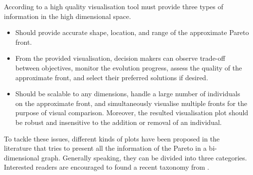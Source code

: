 According to \citet{Gao2019} a high quality visualisation tool must provide three types of information in the high dimensional space. 
\begin{itemize}
\item  Should provide accurate shape, location, and range of the approximate Pareto front. 
\item  From the provided visualisation, decision makers can observe trade-off between objectives, monitor the evolution progress, assess the quality of the approximate front, and select their preferred solutions if desired. 
\item  Should be scalable to any dimensions, handle a large number of individuals on the approximate front, and simultaneously visualise multiple fronts for the purpose of visual comparison. Moreover, the resulted visualisation plot should be robust and insensitive to the addition or removal of an individual.
\end{itemize}

To tackle these issues, different kinds of plots have been proposed in the literature that tries to present all the information of the Pareto in a bi-dimensional graph. Generally speaking, they can be divided into three categories. Interested readers are encouraged to found a recent taxonomy from \citet{B.2018}.

